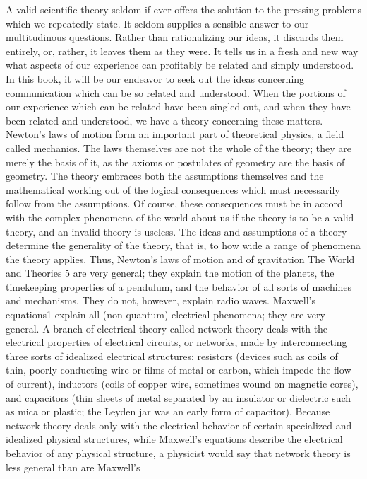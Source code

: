 A valid scientific theory seldom if ever offers the solution to the
pressing problems which we repeatedly state. It seldom supplies
a sensible answer to our multitudinous questions. Rather than
rationalizing our ideas, it discards them entirely, or, rather, it
leaves them as they were. It tells us in a fresh and new way what
aspects of our experience can profitably be related and simply
understood. In this book, it will be our endeavor to seek out the
ideas concerning communication which can be so related and
understood.
When the portions of our experience which can be related have
been singled out, and when they have been related and understood,
we have a theory concerning these matters. Newton’s laws of
motion form an important part of theoretical physics, a field called
mechanics. The laws themselves are not the whole of the theory;
they are merely the basis of it, as the axioms or postulates of
geometry are the basis of geometry. The theory embraces both the
assumptions themselves and the mathematical working out of the
logical consequences which must necessarily follow from the
assumptions. Of course, these consequences must be in accord
with the complex phenomena of the world about us if the theory
is to be a valid theory, and an invalid theory is useless.
The ideas and assumptions of a theory determine the generality
of the theory, that is, to how wide a range of phenomena the
theory applies. Thus, Newton’s laws of motion and of gravitation
The World and Theories 5
are very general; they explain the motion of the planets, the timekeeping
properties of a pendulum, and the behavior of all sorts of
machines and mechanisms. They do not, however, explain radio
waves.
Maxwell’s equations1 explain all (non-quantum) electrical phenomena;
they are very general. A branch of electrical theory called
network theory deals with the electrical properties of electrical
circuits, or networks, made by interconnecting three sorts of idealized
electrical structures: resistors (devices such as coils of thin,
poorly conducting wire or films of metal or carbon, which impede
the flow of current), inductors (coils of copper wire, sometimes
wound on magnetic cores), and capacitors (thin sheets of metal
separated by an insulator or dielectric such as mica or plastic; the
Leyden jar was an early form of capacitor). Because network
theory deals only with the electrical behavior of certain specialized
and idealized physical structures, while Maxwell’s equations describe
the electrical behavior of any physical structure, a physicist
would say that network theory is less general than are Maxwell’s
